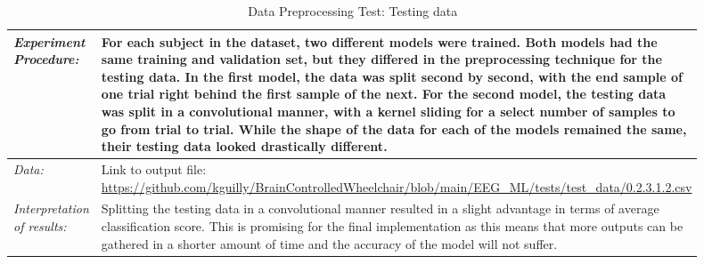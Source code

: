 \documentclass[conference]{IEEEtran}
\begin{document}
\begin{table}[!ht]
\begin{tabular}{|>{\columncolor{black!5}}p{0.25\linewidth}|>{}p{0.65\linewidth}|}
            \textit{Experiment Procedure:} & For each subject in the dataset, two different models were trained. Both models had the same training and validation set, but they differed in the preprocessing technique for the testing data. In the first model, the data was split second by second, with the end sample of one trial right behind the first sample of the next. For the second model, the testing data was split in a convolutional manner, with a kernel sliding for a select number of samples to go from trial to trial. While the shape of the data for each of the models remained the same, their testing data looked drastically different. 
            \\ \hline 

            \textit{Data:} & Link to output file: \url{https://github.com/kguilly/BrainControlledWheelchair/blob/main/EEG_ML/tests/test_data/0.2.3.1.2.csv} 

            \\ \hline 

            \textit{Interpretation of results:} & Splitting the testing data in a convolutional manner resulted in a slight advantage in terms of average classification score. This is promising for the final implementation as this means that more outputs can be gathered in a shorter amount of time and the accuracy of the model will not suffer. 

            \\ \hline

        \end{tabular}           
        \caption{Data Preprocessing Test: Testing data}
        \label{tab:moving_avg_testing}
    \end{table}
\end{document}
